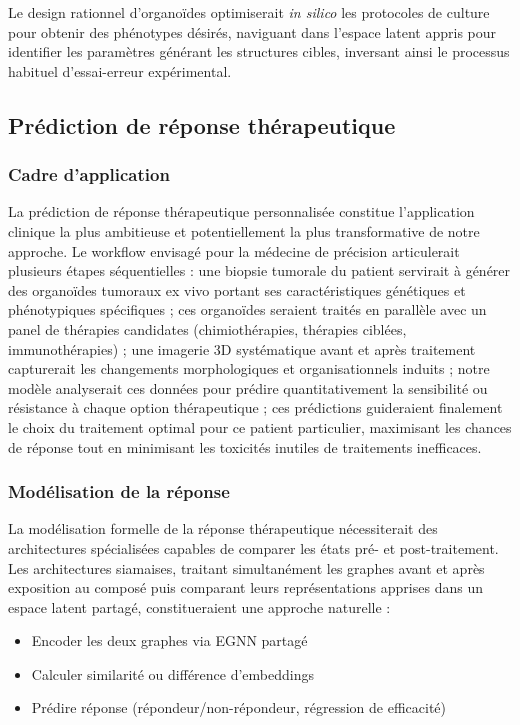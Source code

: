 Le design rationnel d'organoïdes optimiserait \textit{in silico} les protocoles de culture pour obtenir des phénotypes désirés, naviguant dans l'espace latent appris pour identifier les paramètres générant les structures cibles, inversant ainsi le processus habituel d'essai-erreur expérimental.

\subsection{Prédiction de réponse thérapeutique}

\subsubsection{Cadre d'application}

La prédiction de réponse thérapeutique personnalisée constitue l'application clinique la plus ambitieuse et potentiellement la plus transformative de notre approche. Le workflow envisagé pour la médecine de précision articulerait plusieurs étapes séquentielles : une biopsie tumorale du patient servirait à générer des organoïdes tumoraux ex vivo portant ses caractéristiques génétiques et phénotypiques spécifiques ; ces organoïdes seraient traités en parallèle avec un panel de thérapies candidates (chimiothérapies, thérapies ciblées, immunothérapies) ; une imagerie 3D systématique avant et après traitement capturerait les changements morphologiques et organisationnels induits ; notre modèle analyserait ces données pour prédire quantitativement la sensibilité ou résistance à chaque option thérapeutique ; ces prédictions guideraient finalement le choix du traitement optimal pour ce patient particulier, maximisant les chances de réponse tout en minimisant les toxicités inutiles de traitements inefficaces.

\subsubsection{Modélisation de la réponse}

La modélisation formelle de la réponse thérapeutique nécessiterait des architectures spécialisées capables de comparer les états pré- et post-traitement. Les architectures siamaises, traitant simultanément les graphes avant et après exposition au composé puis comparant leurs représentations apprises dans un espace latent partagé, constitueraient une approche naturelle :
\begin{itemize}
    \item Encoder les deux graphes via EGNN partagé
    \item Calculer similarité ou différence d'embeddings
    \item Prédire réponse (répondeur/non-répondeur, régression de efficacité)
\end{itemize}

